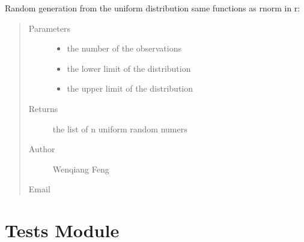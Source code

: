 \documentclass[letterpaper,12pt,english]{sphinxmanual}
\begin{document}
\begin{fulllineitems}
Random generation from the uniform distribution
same functions as rnorm in r: 
\begin{quote}\begin{description}
\item[{Parameters}] \leavevmode\begin{itemize}
\item {} 
 \textendash{} the number of the observations

\item {} 
 \textendash{} the lower limit of the distribution

\item {} 
 \textendash{} the upper limit of the distribution

\end{itemize}

\item[{Returns}] \leavevmode
the list of n uniform random numers

\item[{Author}] \leavevmode
Wenqiang Feng

\item[{Email}] \leavevmode
{}

\end{description}\end{quote}

\end{fulllineitems}



\section{Tests Module}
\label{\detokenize{api:tests-module}}

\subsection{}
\label{\detokenize{api:module-statspy.tests}}\label{\detokenize{api:t-test}}
\end{document}
